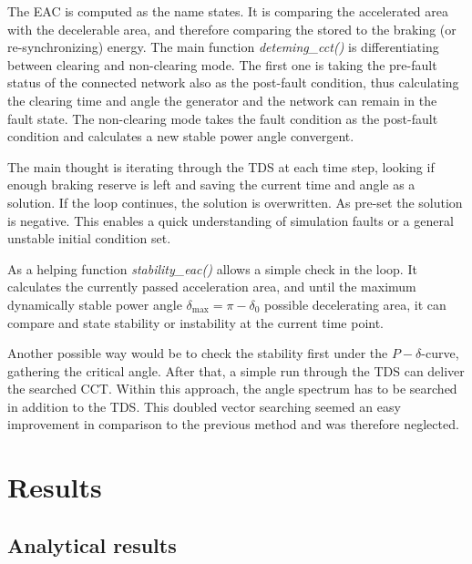The \acf{EAC} is computed as the name states. It is comparing the accelerated area with the decelerable area, and therefore comparing the stored to the braking (or re-synchronizing) energy. The main function {\itshape deteming\_cct()} is differentiating between clearing and non-clearing mode. The first one is taking the pre-fault status of the connected network also as the post-fault condition, thus calculating the clearing time and angle the generator and the network can remain in the fault state. The non-clearing mode takes the fault condition as the post-fault condition and calculates a new stable power angle convergent.

% 

The main thought is iterating through the \acs{TDS} at each time step, looking if enough braking reserve is left and saving the current time and angle as a solution. If the loop continues, the solution is overwritten. As pre-set the solution is negative. This enables a quick understanding of simulation faults or a general unstable initial condition set.

As a helping function {\itshape stability\_eac()} allows a simple check in the loop. It calculates the currently passed acceleration area, and until the maximum dynamically stable power angle $\delta_\mathrm{max}=\pi-\delta_\mathrm{0}$ possible decelerating area, it can compare and state stability or instability at the current time point.


Another possible way would be to check the stability first under the $P-\delta$-curve, gathering the critical angle. After that, a simple run through the \acs{TDS} can deliver the searched \acs{CCT}. Within this approach, the angle spectrum has to be searched in addition to the \acs{TDS}. This doubled vector searching seemed an easy improvement in comparison to the previous method and was therefore neglected.

\chapter{Results}
\label{chap:results}

\section{Analytical results}
\label{sec:analytical-results}

